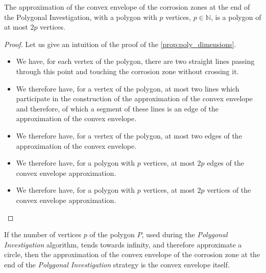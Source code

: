 \begin{proposition}
	The approximation of the convex envelope of the corrosion zones at the end of the Polygonal Investigation, with a polygon with $p$ vertices, $p \in \mathbb{N}$, is a polygon of at most $2 p$ vertices.
	\label{prop:poly_dimensions}
\end{proposition}
\begin{proof}
	Let us give an intuition of the proof of the \ref{prop:poly_dimensions}.
	\begin{itemize}
		\item We have, for each vertex of the polygon, there are two straight lines passing through this point and touching the corrosion zone without crossing it.
		\item We therefore have, for a vertex of the polygon, at most two lines which participate in the construction of the approximation of the convex envelope and therefore, of which a segment of these lines is an edge of the approximation of the convex envelope.
		\item We therefore have, for a vertex of the polygon, at most two edges of the approximation of the convex envelope.
		\item We therefore have, for a polygon with $p$ vertices, at most $2p$ edges of the convex envelope approximation.
		\item We therefore have, for a polygon with $p$ vertices, at most $2p$ vertices of the convex envelope approximation.
	\end{itemize}
\end{proof}

\begin{conjecture}
	If the number of vertices $p$ of the polygon $P$, used during the \textit{Polygonal Investigation} algorithm, tends towards infinity, and therefore approximate a circle, then the approximation of the convex envelope of the corrosion zone at the end of the \textit{Polygonal Investigation} strategy is the convex envelope itself.
	\label{prop:circle}
\end{conjecture}

